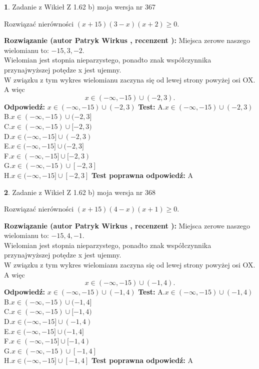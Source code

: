 \documentclass[12pt, a4paper]{article}
\theoremstyle{definition} %
\newtheorem{zad}{}
\newcommand{\zadStart}[1]{\begin{zad}#1\newline}
\newcommand{\zadStop}{\end{zad}}
\newcommand{\rozwStart}[2]{\noindent \textbf{Rozwiązanie (autor #1 , recenzent #2): }\newline}
\newcommand{\rozwStop}{\newline}
\newcommand{\odpStart}{\noindent \textbf{Odpowiedź:}\newline}
\newcommand{\odpStop}{\newline}
\newcommand{\testStart}{\noindent \textbf{Test:}\newline}
\newcommand{\testStop}{\newline}
\newcommand{\kluczStart}{\noindent \textbf{Test poprawna odpowiedź:}\newline}
\newcommand{\kluczStop}{\newline}
\begin{document}
\zadStart{Zadanie z Wikieł Z 1.62 b) moja wersja nr 367}

Rozwiązać nierówności $(x+15)(3-x)(x+2)\ge0$.
\zadStop
\rozwStart{Patryk Wirkus}{}
Miejsca zerowe naszego wielomianu to: $-15, 3, -2$.\\
Wielomian jest stopnia nieparzystego, ponadto znak współczynnika przy\linebreak najwyższej potędze x jest ujemny.\\ W związku z tym wykres wielomianu zaczyna się od lewej strony powyżej osi OX. A więc $$x \in (-\infty,-15) \cup (-2,3).$$
\rozwStop
\odpStart
$x \in (-\infty,-15) \cup (-2,3)$
\odpStop
\testStart
A.$x \in (-\infty,-15) \cup (-2,3)$\\
B.$x \in (-\infty,-15) \cup (-2,3]$\\
C.$x \in (-\infty,-15) \cup [-2,3)$\\
D.$x \in (-\infty,-15] \cup (-2,3)$\\
E.$x \in (-\infty,-15] \cup (-2,3]$\\
F.$x \in (-\infty,-15] \cup [-2,3)$\\
G.$x \in (-\infty,-15) \cup [-2,3]$\\
H.$x \in (-\infty,-15] \cup [-2,3]$
\testStop
\kluczStart
A
\kluczStop



\zadStart{Zadanie z Wikieł Z 1.62 b) moja wersja nr 368}

Rozwiązać nierówności $(x+15)(4-x)(x+1)\ge0$.
\zadStop
\rozwStart{Patryk Wirkus}{}
Miejsca zerowe naszego wielomianu to: $-15, 4, -1$.\\
Wielomian jest stopnia nieparzystego, ponadto znak współczynnika przy\linebreak najwyższej potędze x jest ujemny.\\ W związku z tym wykres wielomianu zaczyna się od lewej strony powyżej osi OX. A więc $$x \in (-\infty,-15) \cup (-1,4).$$
\rozwStop
\odpStart
$x \in (-\infty,-15) \cup (-1,4)$
\odpStop
\testStart
A.$x \in (-\infty,-15) \cup (-1,4)$\\
B.$x \in (-\infty,-15) \cup (-1,4]$\\
C.$x \in (-\infty,-15) \cup [-1,4)$\\
D.$x \in (-\infty,-15] \cup (-1,4)$\\
E.$x \in (-\infty,-15] \cup (-1,4]$\\
F.$x \in (-\infty,-15] \cup [-1,4)$\\
G.$x \in (-\infty,-15) \cup [-1,4]$\\
H.$x \in (-\infty,-15] \cup [-1,4]$
\testStop
\kluczStart
A
\kluczStop
\end{document}
